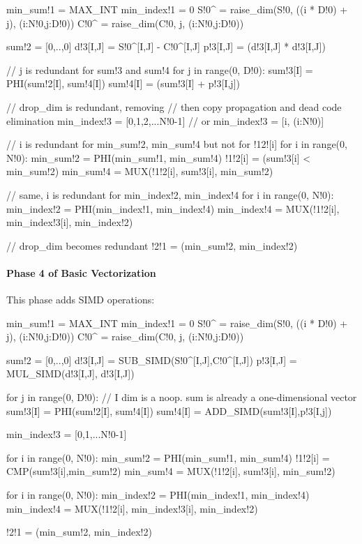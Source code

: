 {\small
\begin{pythonn}
min_sum!1 = MAX_INT
min_index!1 = 0
S!0^ = raise_dim(S!0, ((i * D!0) + j), (i:N!0,j:D!0))
C!0^ = raise_dim(C!0, j, (i:N!0,j:D!0))

sum!2 = [0,..,0]
d!3[I,J] = S!0^[I,J] - C!0^[I,J]
p!3[I,J] = (d!3[I,J] * d!3[I,J])

// j is redundant for sum!3 and sum!4
for j in range(0, D!0):
  sum!3[I] = PHI(sum!2[I], sum!4[I])       
  sum!4[I] = (sum!3[I] + p!3[I,j])

// drop_dim is redundant, removing
// then copy propagation and dead code elimination 
min_index!3 = [0,1,2,...N!0-1] // or min_index!3 = [i, (i:N!0)]

// i is redundant for min_sum!2, min_sum!4 but not for !12![i]
for i in range(0, N!0):
  min_sum!2 = PHI(min_sum!1, min_sum!4) 
  !1!2[i] = (sum!3[i] < min_sum!2)
  min_sum!4 = MUX(!1!2[i], sum!3[i], min_sum!2)

// same, i is redundant for min_index!2, min_index!4
for i in range(0, N!0):
  min_index!2 = PHI(min_index!1, min_index!4)  
   min_index!4 = MUX(!1!2[i], min_index!3[i], min_index!2)

// drop_dim becomes redundant
!2!1 = (min_sum!2, min_index!2)
\end{pythonn}
}

\paragraph{Phase 4 of Basic Vectorization}

This phase adds SIMD operations:

{\small
\begin{pythonn}
min_sum!1 = MAX_INT
min_index!1 = 0
S!0^ = raise_dim(S!0, ((i * D!0) + j), (i:N!0,j:D!0))
C!0^ = raise_dim(C!0, j, (i:N!0,j:D!0))

sum!2 = [0,..,0]
d!3[I,J] = SUB_SIMD(S!0^[I,J],C!0^[I,J])
p!3[I,J] = MUL_SIMD(d!3[I,J], d!3[I,J])

for j in range(0, D!0):
  // I dim is a noop. sum is already a one-dimensional vector
  sum!3[I] = PHI(sum!2[I], sum!4[I])       
  sum!4[I] = ADD_SIMD(sum!3[I],p!3[I,j])

min_index!3 = [0,1,...N!0-1]   

for i in range(0, N!0):
  min_sum!2 = PHI(min_sum!1, min_sum!4) 
  !1!2[i] = CMP(sum!3[i],min_sum!2)
  min_sum!4 = MUX(!1!2[i], sum!3[i], min_sum!2)
    
for i in range(0, N!0):
  min_index!2 = PHI(min_index!1, min_index!4)  
  min_index!4 = MUX(!1!2[i], min_index!3[i], min_index!2)
   
!2!1 = (min_sum!2, min_index!2)   
\end{pythonn}
}


